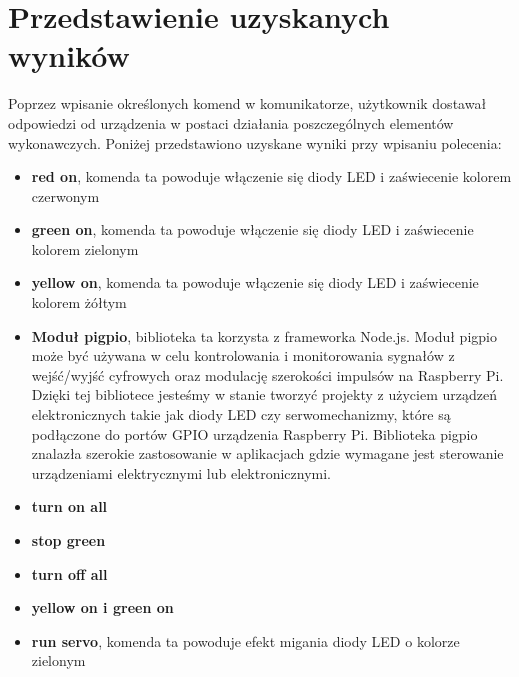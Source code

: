 \section{Przedstawienie uzyskanych wyników}
Poprzez wpisanie określonych komend w komunikatorze, użytkownik dostawał odpowiedzi od urządzenia w postaci działania poszczególnych elementów wykonawczych. Poniżej przedstawiono uzyskane wyniki przy wpisaniu polecenia:
\begin{itemize}  
	\item \textbf{red on}, komenda ta powoduje włączenie się diody LED i zaświecenie kolorem czerwonym
	\\
	\item \textbf{green on}, komenda ta powoduje włączenie się diody LED i zaświecenie kolorem zielonym
	\\
\item \textbf{yellow on}, komenda ta powoduje włączenie się diody LED i zaświecenie kolorem żółtym
	\\
	\item \textbf{Moduł pigpio}, biblioteka ta korzysta z frameworka Node.js. Moduł pigpio może być używana w celu kontrolowania i monitorowania sygnałów z wejść/wyjść cyfrowych oraz modulację szerokości impulsów na Raspberry Pi. Dzięki tej bibliotece jesteśmy w stanie tworzyć projekty z użyciem urządzeń elektronicznych takie jak diody LED czy serwomechanizmy, które są podłączone do portów GPIO urządzenia Raspberry Pi. Biblioteka pigpio znalazła szerokie zastosowanie w aplikacjach gdzie wymagane jest sterowanie urządzeniami elektrycznymi lub elektronicznymi.
	\\
\item \textbf{turn on all}
	\\
	\item \textbf{stop green}
	\\
\item \textbf{turn off all}
	\\
	\item \textbf{yellow on i green on}
	\\
\item \textbf{run servo}, komenda ta powoduje efekt migania diody LED o kolorze zielonym
	\\
\end{itemize}



